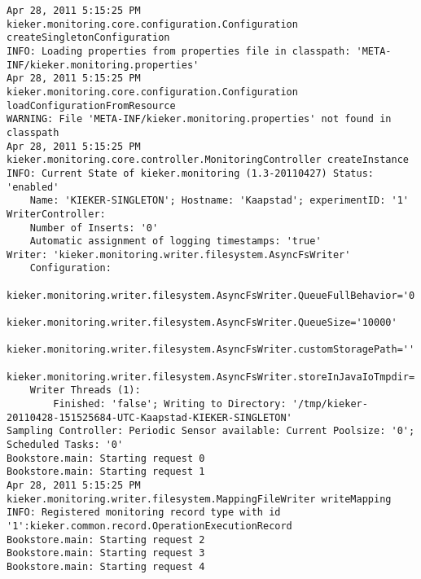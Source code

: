 \setTextListing
\begin{lstlisting}[caption=Execution of the manually instrumented Bookstore application (Section~\ref{sec:example:monitoring})]
Apr 28, 2011 5:15:25 PM kieker.monitoring.core.configuration.Configuration createSingletonConfiguration
INFO: Loading properties from properties file in classpath: 'META-INF/kieker.monitoring.properties'
Apr 28, 2011 5:15:25 PM kieker.monitoring.core.configuration.Configuration loadConfigurationFromResource
WARNING: File 'META-INF/kieker.monitoring.properties' not found in classpath
Apr 28, 2011 5:15:25 PM kieker.monitoring.core.controller.MonitoringController createInstance
INFO: Current State of kieker.monitoring (1.3-20110427) Status: 'enabled'
	Name: 'KIEKER-SINGLETON'; Hostname: 'Kaapstad'; experimentID: '1'
WriterController:
	Number of Inserts: '0'
	Automatic assignment of logging timestamps: 'true'
Writer: 'kieker.monitoring.writer.filesystem.AsyncFsWriter'
	Configuration:
		kieker.monitoring.writer.filesystem.AsyncFsWriter.QueueFullBehavior='0'
		kieker.monitoring.writer.filesystem.AsyncFsWriter.QueueSize='10000'
		kieker.monitoring.writer.filesystem.AsyncFsWriter.customStoragePath=''
		kieker.monitoring.writer.filesystem.AsyncFsWriter.storeInJavaIoTmpdir='true'
	Writer Threads (1): 
		Finished: 'false'; Writing to Directory: '/tmp/kieker-20110428-151525684-UTC-Kaapstad-KIEKER-SINGLETON'
Sampling Controller: Periodic Sensor available: Current Poolsize: '0'; Scheduled Tasks: '0'
Bookstore.main: Starting request 0
Bookstore.main: Starting request 1
Apr 28, 2011 5:15:25 PM kieker.monitoring.writer.filesystem.MappingFileWriter writeMapping
INFO: Registered monitoring record type with id '1':kieker.common.record.OperationExecutionRecord
Bookstore.main: Starting request 2
Bookstore.main: Starting request 3
Bookstore.main: Starting request 4
\end{lstlisting}
